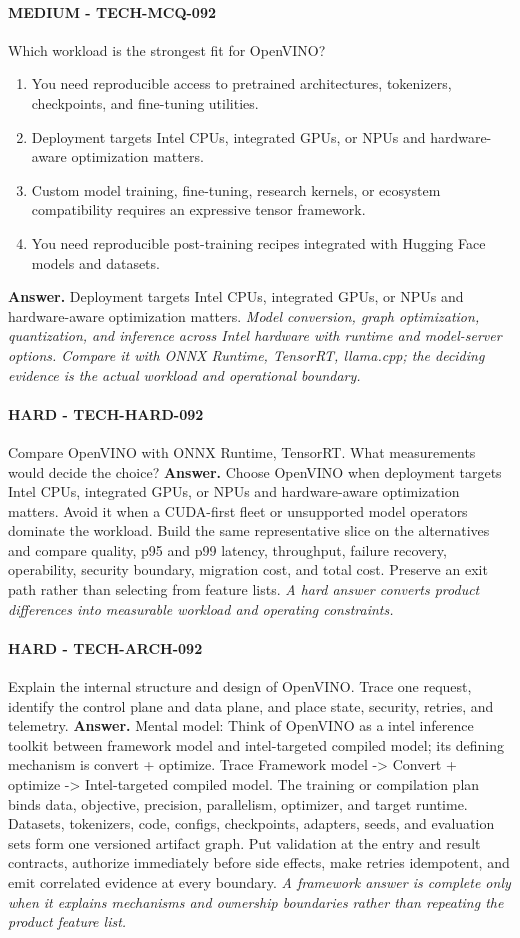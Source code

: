 \paragraph{MEDIUM - TECH-MCQ-092} Which workload is the strongest fit for OpenVINO?
\begin{enumerate}[label=\Alph*.]
\item You need reproducible access to pretrained architectures, tokenizers, checkpoints, and fine-tuning utilities.
\item Deployment targets Intel CPUs, integrated GPUs, or NPUs and hardware-aware optimization matters.
\item Custom model training, fine-tuning, research kernels, or ecosystem compatibility requires an expressive tensor framework.
\item You need reproducible post-training recipes integrated with Hugging Face models and datasets.
\end{enumerate}
\textbf{Answer.} Deployment targets Intel CPUs, integrated GPUs, or NPUs and hardware-aware optimization matters.
\textit{Model conversion, graph optimization, quantization, and inference across Intel hardware with runtime and model-server options. Compare it with ONNX Runtime, TensorRT, llama.cpp; the deciding evidence is the actual workload and operational boundary.}
\paragraph{HARD - TECH-HARD-092} Compare OpenVINO with ONNX Runtime, TensorRT. What measurements would decide the choice?
\textbf{Answer.} Choose OpenVINO when deployment targets Intel CPUs, integrated GPUs, or NPUs and hardware-aware optimization matters. Avoid it when a CUDA-first fleet or unsupported model operators dominate the workload. Build the same representative slice on the alternatives and compare quality, p95 and p99 latency, throughput, failure recovery, operability, security boundary, migration cost, and total cost. Preserve an exit path rather than selecting from feature lists.
\textit{A hard answer converts product differences into measurable workload and operating constraints.}
\paragraph{HARD - TECH-ARCH-092} Explain the internal structure and design of OpenVINO. Trace one request, identify the control plane and data plane, and place state, security, retries, and telemetry.
\textbf{Answer.} Mental model: Think of OpenVINO as a intel inference toolkit between framework model and intel-targeted compiled model; its defining mechanism is convert + optimize. Trace Framework model -> Convert + optimize -> Intel-targeted compiled model. The training or compilation plan binds data, objective, precision, parallelism, optimizer, and target runtime. Datasets, tokenizers, code, configs, checkpoints, adapters, seeds, and evaluation sets form one versioned artifact graph. Put validation at the entry and result contracts, authorize immediately before side effects, make retries idempotent, and emit correlated evidence at every boundary.
\textit{A framework answer is complete only when it explains mechanisms and ownership boundaries rather than repeating the product feature list.}
